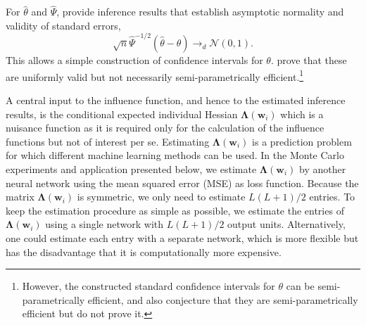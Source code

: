 \documentclass[a4paper, 12pt]{article}
\begin{document}
For $\hat{\theta}$ and $\hat{\Psi}$,  provide inference results that establish asymptotic normality and validity of standard errors, 
\begin{equation} \label{eq:psiNormal}
\sqrt{n}\hat{\Psi}^{-1/2}\left(\hat{\theta}-\theta\right)\rightarrow_d\mathcal{N}\left(0, 1\right).
\end{equation} 
This allows a simple construction of confidence intervals for $\theta$.  prove that these are uniformly valid but not necessarily semi-parametrically efficient.\footnote{However, the constructed standard confidence intervals for $\theta$ can be semi-parametrically efficient, and  also conjecture that they are semi-parametrically  efficient but do not prove it.}


A central input to the influence function, and hence to the estimated inference results, is the  conditional expected individual Hessian $\bm{\Lambda}(\bm{w}_i)$ which is a nuisance function as it is required only for the calculation of the influence functions but not of interest per se. Estimating $\bm{\Lambda}(\bm{w}_i)$ is a prediction problem for which different machine learning methods can be used.
In the Monte Carlo experiments and application presented below, we estimate $\bm{\Lambda}(\bm{w}_i)$ by another neural network  using the mean squared error (MSE) as loss function. Because the matrix $\bm{\Lambda}(\bm{w}_i)$ is symmetric, we only need to estimate $L(L+1)/2$ entries. To keep the estimation procedure as simple as possible, we estimate the entries of $\bm{\Lambda}(\bm{w}_i)$ using a single network with $L(L+1)/2$ output units. Alternatively, one could estimate each entry with a separate network, which is more flexible but has the disadvantage that it is computationally more expensive. 
\end{document}
